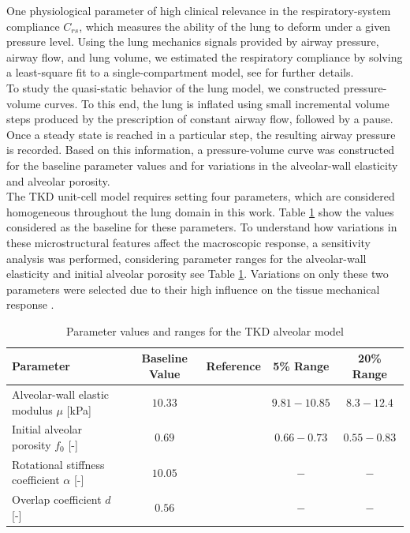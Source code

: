 \documentclass[preprint,3p,12pt,number,sort&compress]{elsarticle}
\begin{document}
One physiological parameter of high clinical relevance in the respiratory-system compliance $C_{rs}$, which measures the ability of the lung to deform under a given pressure level. Using the lung mechanics signals provided by airway pressure, airway flow, and lung volume, we estimated the respiratory compliance by solving a least-square fit to a single-compartment model, see \cite{bates1994lung,avileshurtado2022whole} for further details.\\

To study the quasi-static behavior of the lung model, we constructed pressure-volume curves. To this end, the lung is inflated using small incremental volume steps produced by the prescription of constant airway flow, followed by a pause. Once a steady state is reached in a particular step, the resulting airway pressure is recorded. Based on this information, a pressure-volume curve was constructed for the baseline parameter values and for variations in the alveolar-wall elasticity and alveolar porosity.\\ 

The TKD unit-cell model requires setting four parameters, which are considered homogeneous throughout the lung domain in this work. Table \ref{tab:tkd-parameters} show the values considered as the baseline for these parameters. To understand how variations in these microstructural features affect the macroscopic response, a sensitivity analysis was performed, considering parameter ranges for the alveolar-wall elasticity and initial alveolar porosity see Table \ref{tab:tkd-parameters}. Variations on only these two parameters were selected due to their high influence on the tissue mechanical response \cite{concha2020upscaling}.

\begin{table}[]
\centering
\begin{tabular}{l|cccc}
\hline
Parameter   &   Baseline Value  &    Reference  & 5\% Range  & 20\% Range  \\ \hline
Alveolar-wall elastic modulus $\mu$ [kPa] & $10.33$& \cite{PerlmanAndWu2014,concha2020upscaling}  & $9.81-10.85$ & $8.3-12.4$  \\
Initial alveolar porosity $f_0$ [-] & $0.69$ &\cite{concha2020upscaling}  &$0.66-0.73$  & $0.55-0.83$  \\
Rotational stiffness coefficient $\alpha$ [-]  & $10.05$ & \cite{concha2020upscaling} & $-$ &$-$  \\
Overlap coefficient $d$ [-]& $0.56$ &  \cite{concha2020upscaling}&  $-$ & $-$  \\ \hline
\end{tabular}
\caption{Parameter values and ranges for the TKD alveolar model}\label{tab:tkd-parameters}
\end{table}
\end{document}
